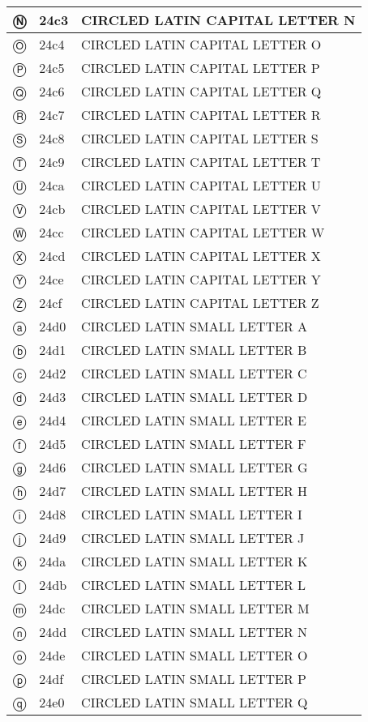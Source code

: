 \documentclass[12pt,letterpaper,openany]{book}
\begin{document}
\begin{center}
\begin{supertabular}{|m{0.25in}|m{0.5in}|m{4in}|}
Ⓝ & 24c3 & CIRCLED LATIN CAPITAL LETTER N\\\hline
Ⓞ & 24c4 & CIRCLED LATIN CAPITAL LETTER O\\\hline
Ⓟ & 24c5 & CIRCLED LATIN CAPITAL LETTER P\\\hline
Ⓠ & 24c6 & CIRCLED LATIN CAPITAL LETTER Q\\\hline
Ⓡ & 24c7 & CIRCLED LATIN CAPITAL LETTER R\\\hline
Ⓢ & 24c8 & CIRCLED LATIN CAPITAL LETTER S\\\hline
Ⓣ & 24c9 & CIRCLED LATIN CAPITAL LETTER T\\\hline
Ⓤ & 24ca & CIRCLED LATIN CAPITAL LETTER U\\\hline
Ⓥ & 24cb & CIRCLED LATIN CAPITAL LETTER V\\\hline
Ⓦ & 24cc & CIRCLED LATIN CAPITAL LETTER W\\\hline
Ⓧ & 24cd & CIRCLED LATIN CAPITAL LETTER X\\\hline
Ⓨ & 24ce & CIRCLED LATIN CAPITAL LETTER Y\\\hline
Ⓩ & 24cf & CIRCLED LATIN CAPITAL LETTER Z\\\hline
ⓐ & 24d0 & CIRCLED LATIN SMALL LETTER A\\\hline
ⓑ & 24d1 & CIRCLED LATIN SMALL LETTER B\\\hline
ⓒ & 24d2 & CIRCLED LATIN SMALL LETTER C\\\hline
ⓓ & 24d3 & CIRCLED LATIN SMALL LETTER D\\\hline
ⓔ & 24d4 & CIRCLED LATIN SMALL LETTER E\\\hline
ⓕ & 24d5 & CIRCLED LATIN SMALL LETTER F\\\hline
ⓖ & 24d6 & CIRCLED LATIN SMALL LETTER G\\\hline
ⓗ & 24d7 & CIRCLED LATIN SMALL LETTER H\\\hline
ⓘ & 24d8 & CIRCLED LATIN SMALL LETTER I\\\hline
ⓙ & 24d9 & CIRCLED LATIN SMALL LETTER J\\\hline
ⓚ & 24da & CIRCLED LATIN SMALL LETTER K\\\hline
ⓛ & 24db & CIRCLED LATIN SMALL LETTER L\\\hline
ⓜ & 24dc & CIRCLED LATIN SMALL LETTER M\\\hline
ⓝ & 24dd & CIRCLED LATIN SMALL LETTER N\\\hline
ⓞ & 24de & CIRCLED LATIN SMALL LETTER O\\\hline
ⓟ & 24df & CIRCLED LATIN SMALL LETTER P\\\hline
ⓠ & 24e0 & CIRCLED LATIN SMALL LETTER Q\\\hline

\end{supertabular}
\end{center}
\end{document}
